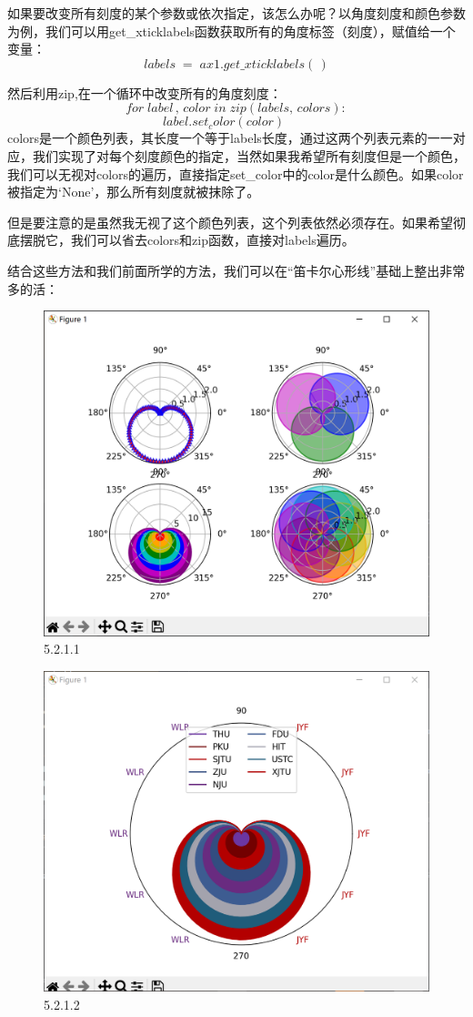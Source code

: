 \documentclass[12pt]{article}
\begin{document}
如果要改变所有刻度的某个参数或依次指定，该怎么办呢？以角度刻度和颜色参数为例，我们可以用get\_xticklabels函数获取所有的角度标签（刻度），赋值给一个变量：
\[labels\; =\; ax1.get\_xticklabels(\,)\]

然后利用zip,在一个循环中改变所有的角度刻度：
\[for\; label\,,\, color\; in\; zip(labels,\, colors):\]
    \[label.set_color(color)\qquad\]
colors是一个颜色列表，其长度一个等于labels长度，通过这两个列表元素的一一对应，我们实现了对每个刻度颜色的指定，当然如果我希望所有刻度但是一个颜色，我们可以无视对colors的遍历，直接指定set\_color中的color是什么颜色。如果color被指定为‘None’，那么所有刻度就被抹除了。

但是要注意的是虽然我无视了这个颜色列表，这个列表依然必须存在。如果希望彻底摆脱它，我们可以省去colors和zip函数，直接对labels遍历。

结合这些方法和我们前面所学的方法，我们可以在“笛卡尔心形线”基础上整出非常多的活：
\begin{figure}[H]
    \centering
    \includegraphics[width=0.65\linewidth]{极坐标 Pic2.png}
    \caption{5.2.1.1}
    \label{fig:enter-label}
\end{figure}
\begin{figure}[H]
    \centering
    \includegraphics[width=0.65\linewidth]{极坐标 Pic3.png}
    \caption{5.2.1.2}
    \label{fig:enter-label}
\end{figure}
\end{document}
